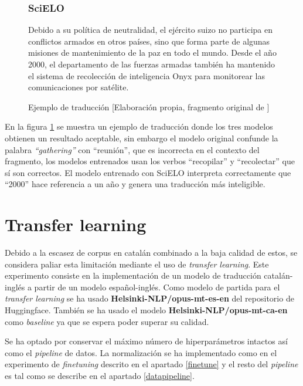 \begin{figure}[H]
\subsubsection{SciELO}
\begin{spverbatim}
Debido a su política de neutralidad, el ejército suizo no participa en conflictos armados en otros países, sino que forma parte de algunas misiones de mantenimiento de la paz en todo el mundo. Desde el año 2000, el departamento de las fuerzas armadas también ha mantenido el sistema de recolección de inteligencia Onyx para monitorear las comunicaciones por satélite.
\end{spverbatim}
\caption{Ejemplo de traducción [Elaboración propia, fragmento original de \cite{ContributorstoWikimediaprojects2022Jan}]}\label{ejemplotranslate}
\end{figure}

En la figura \ref{ejemplotranslate} se muestra un ejemplo de traducción donde los tres modelos obtienen un resultado aceptable, sin embargo el modelo original confunde la palabra \textit{``gathering''} con ``reunión'', que es incorrecta en el contexto del fragmento, los modelos entrenados usan los verbos ``recopilar'' y ``recolectar'' que sí son correctos.
El modelo entrenado con SciELO interpreta correctamente que ``2000'' hace referencia a un año y genera una traducción más inteligible.


\section{Transfer learning}
Debido a la escasez de corpus en catalán combinado a la baja calidad de estos, se considera paliar esta limitación mediante el uso de \textit{transfer learning}.
Este experimento consiste en la implementación de un modelo de traducción catalán-inglés a partir de un modelo español-inglés.
Como modelo de partida para el \textit{transfer learning} se ha usado \textbf{Helsinki-NLP/opus-mt-es-en} del repositorio de Huggingface. También se ha usado el modelo \textbf{Helsinki-NLP/opus-mt-ca-en} como \textit{baseline} ya que se espera poder superar su calidad.

Se ha optado por conservar el máximo número de hiperparámetros intactos así como el \textit{pipeline} de datos. La normalización se ha implementado como en el experimento de \textit{finetuning} descrito en el apartado \ref{finetune} y el resto del \textit{pipeline} es tal como se describe en el apartado \ref{datapipeline}.

